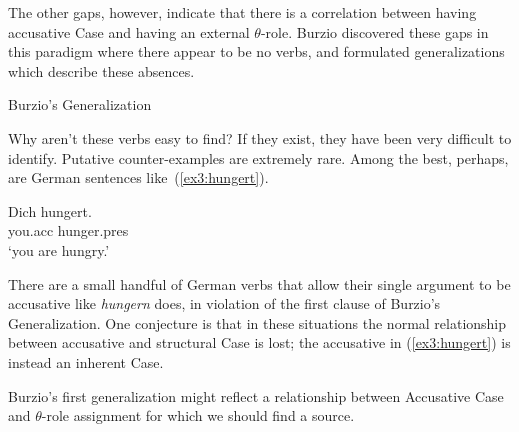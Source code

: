 The other gaps, however, indicate that there is a correlation between having accusative Case and having an external $\theta$-role. Burzio discovered these gaps in this paradigm where there appear to be no verbs, and formulated generalizations which describe these absences.
\pagebreak
\begin{exe}
	\ex \label{ex3:bg} Burzio's Generalization
	\begin{xlist}
	\end{xlist}
\end{exe}
Why aren't these verbs easy to find? If they exist, they have been very difficult to identify. Putative counter-examples are extremely rare. Among the best, perhaps, are German sentences like~(\ref{ex3:hungert}).
\begin{exe}
	\raggedright
	\ex \label{ex3:hungert} 
	\gll Dich hungert. \\ you.acc hunger.pres \\ `you are hungry.'
\end{exe}
There are a small handful of German verbs that allow their single argument to be accusative like \emph{hungern} does, in violation of the first clause of Burzio's Generalization. One conjecture is that in these situations the normal relationship between accusative and structural Case is lost; the accusative in (\ref{ex3:hungert}) is instead an inherent Case. 

Burzio's first generalization might reflect a relationship between Accusative Case and $\theta$-role assignment for which we should find a source.

